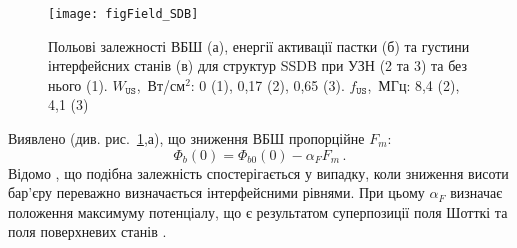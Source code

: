 \begin{figure}
\center
\texttt{[image: figField\_SDB]}
\caption{\label{figField_SDB}
Польові залежності ВБШ (а), енергії активації пастки (б) та густини інтерфейсних станів (в) для структур SSDB при УЗН (2 та 3) та без нього (1).
$W_\mathtt{US}$,~Вт/см$^2$: 0 (1), 0,17 (2), 0,65 (3).
$f_\mathtt{US}$,~МГц: 8,4 (2), 4,1 (3)
}%
\end{figure}

Виявлено (див. рис.~\ref{figField_SDB},а), що зниження ВБШ пропорційне $F_m$:
\begin{equation}\label{eqFbE}
    \Phi_{b}(0)=\Phi_{b0}(0)-\alpha_{F} F_m\,.
\end{equation}
Відомо \cite{Tung:MSE,Rhoderick1988,Em:Parker},
що подібна залежність спостерігається у випадку, коли зниження висоти бар'єру переважно визначається інтерфейсними рівнями.
При цьому  $\alpha_{F}$ визначає положення максимуму потенціалу, що є результатом суперпозиції поля Шотткі та поля поверхневих станів \cite{Em:Parker}.


